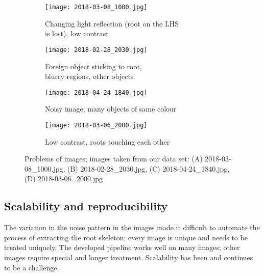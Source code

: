 \begin{figure}[H] 
	\begin{subfigure}[b]{0.5\linewidth}
		\centering
		\texttt{[image: 2018-03-08\_1000.jpg]} 
		\caption{Changing light reflection (root on the LHS\\ is lost), low contrast} 
		\label{fig7:a} 
		\vspace{4ex}
	\end{subfigure}%
	\begin{subfigure}[b]{0.5\linewidth}
		\centering
		\texttt{[image: 2018-02-28\_2030.jpg]} 
		\caption{Foreign object sticking to root, \\blurry regions, other objects} 
		\label{fig7:b} 
		\vspace{4ex}
	\end{subfigure} 
	\begin{subfigure}[b]{0.5\linewidth}
		\centering
		\texttt{[image: 2018-04-24\_1840.jpg]} 
		\caption{Noisy image, many objects of same colour} 
		\label{fig7:c} 
	\end{subfigure}%
	\begin{subfigure}[b]{0.5\linewidth}
		\centering
		\texttt{[image: 2018-03-06\_2000.jpg]} 
		\caption{Low contrast, roots touching each other} 
		\label{fig7:d} 
	\end{subfigure} 
	\caption{Problems of images; images taken from our data set: (A) 2018-03-08\_1000.jpg, (B) 2018-02-28\_2030.jpg, (C) 2018-04-24\_1840.jpg, (D) 2018-03-06\_2000.jpg}
	\label{fig7} 
\end{figure}





\subsection{Scalability and reproducibility}

The variation in the noise pattern in the images made it difficult to automate the process of extracting the root skeleton; every image is unique and needs to be treated uniquely. The developed pipeline works well on many images; other images require special and longer treatment. Scalability has been and continues to be a challenge.

